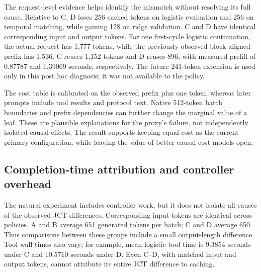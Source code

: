 \documentclass[sigconf, screen, review]{acmart}
\begin{document}
The request-level evidence helps identify the mismatch without resolving
its full cause. Relative to C, D loses 256 cached tokens on logistic
evaluation and 256 on temporal matching, while gaining 128 on ridge
validation. C and D have identical corresponding input and output
tokens. For one first-cycle logistic continuation, the actual request
has 1,777 tokens, while the previously observed block-aligned prefix has
1,536. C reuses 1,152 tokens and D reuses 896, with measured prefill of
0.87787 and 1.39069 seconds, respectively. The future 241-token
extension is used only in this post hoc diagnosis; it was not available
to the policy.

The cost table is calibrated on the observed prefix plus one token,
whereas later prompts include tool results and protocol text. Native
512-token batch boundaries and prefix dependencies can further change
the marginal value of a leaf. These are plausible explanations for the
proxy's failure, not independently isolated causal effects. The result
supports keeping equal cost as the current primary configuration, while
leaving the value of better causal cost models open.

\subsection{Completion-time attribution and controller
overhead}\label{completion-time-attribution-and-controller-overhead}

The natural experiment includes controller work, but it does not isolate
all causes of the observed JCT differences. Corresponding input tokens
are identical across policies. A and B average 651 generated tokens per
batch; C and D average 650. Thus comparisons between these groups
include a small output-length difference. Tool wall times also vary; for
example, mean logistic tool time is 9.3854 seconds under C and 10.5710
seconds under D. Even C--D, with matched input and output tokens, cannot
attribute its entire JCT difference to caching.
\end{document}
